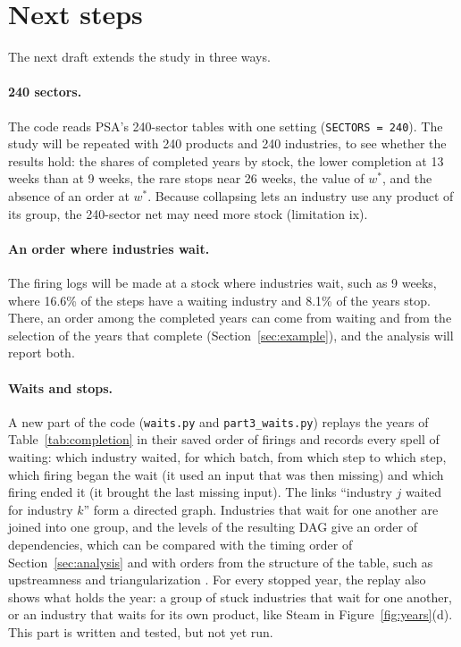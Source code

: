\documentclass[11pt]{article}
\begin{document}
\section{Next steps}\label{sec:next}

The next draft extends the study in three ways.

\paragraph{240 sectors.} The code reads PSA's 240-sector tables with one setting (\texttt{SECTORS = 240}). The study will be repeated with 240 products and 240 industries, to see whether the results hold: the shares of completed years by stock, the lower completion at 13 weeks than at 9 weeks, the rare stops near 26 weeks, the value of $w^*$, and the absence of an order at $w^*$. Because collapsing lets an industry use any product of its group, the 240-sector net may need more stock (limitation ix).

\paragraph{An order where industries wait.} The firing logs will be made at a stock where industries wait, such as 9 weeks, where 16.6\% of the steps have a waiting industry and 8.1\% of the years stop. There, an order among the completed years can come from waiting and from the selection of the years that complete (Section~\ref{sec:example}), and the analysis will report both.

\paragraph{Waits and stops.} A new part of the code (\texttt{waits.py} and \texttt{part3\_waits.py}) replays the years of Table~\ref{tab:completion} in their saved order of firings and records every spell of waiting: which industry waited, for which batch, from which step to which step, which firing began the wait (it used an input that was then missing) and which firing ended it (it brought the last missing input). The links ``industry $j$ waited for industry $k$'' form a directed graph. Industries that wait for one another are joined into one group, and the levels of the resulting DAG give an order of dependencies, which can be compared with the timing order of Section~\ref{sec:analysis} and with orders from the structure of the table, such as upstreamness \citep{Antras2012} and triangularization \citep{Fukui1986}. For every stopped year, the replay also shows what holds the year: a group of stuck industries that wait for one another, or an industry that waits for its own product, like Steam in Figure~\ref{fig:years}(d). This part is written and tested, but not yet run.
\end{document}
